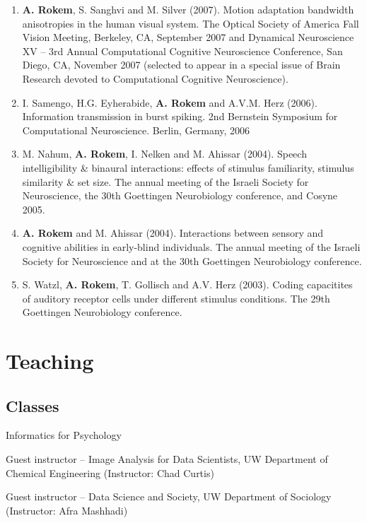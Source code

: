 \documentclass[11pt,fullpage]{article}
\newcommand{\years}[1]{\marginnote{\scriptsize #1}} %
\begin{document}
\begin{enumerate}
\item {\bf A. Rokem}, S. Sanghvi and M. Silver (2007). Motion adaptation bandwidth anisotropies in the human visual system. The Optical Society of America Fall Vision Meeting, Berkeley, CA, September 2007 and Dynamical Neuroscience XV – 3rd Annual Computational Cognitive Neuroscience Conference, San Diego, CA, November 2007 (selected to appear in a special issue of Brain Research devoted to Computational Cognitive Neuroscience).

\item I. Samengo, H.G. Eyherabide, {\bf A. Rokem} and A.V.M. Herz (2006). Information transmission in burst spiking. 2nd Bernstein Symposium for Computational Neuroscience. Berlin, Germany, 2006

\item M. Nahum, {\bf A. Rokem}, I. Nelken and M. Ahissar (2004). Speech intelligibility \& binaural interactions: effects of stimulus familiarity, stimulus similarity \& set size. The annual meeting of the Israeli Society for Neuroscience, the 30th Goettingen Neurobiology conference, and Cosyne 2005.

\item {\bf A. Rokem} and M. Ahissar (2004). Interactions between sensory and cognitive abilities in early-blind individuals. The annual meeting of the Israeli Society for Neuroscience and at the 30th Goettingen Neurobiology conference.

\item S. Watzl, {\bf A. Rokem}, T. Gollisch and A.V. Herz (2003). Coding capacitites of auditory receptor cells under different stimulus conditions. The 29th Goettingen Neurobiology conference.
\end{enumerate}


\section*{Teaching}

\subsection*{Classes}
\years{Spring 2024} Informatics for Psychology

\years{5/2021} Guest instructor -- Image Analysis for Data Scientists,  UW Department of Chemical Engineering (Instructor: Chad Curtis)

\years{5/2018} Guest instructor -- Data Science and Society, UW Department of Sociology (Instructor: Afra Mashhadi)
\end{document}
